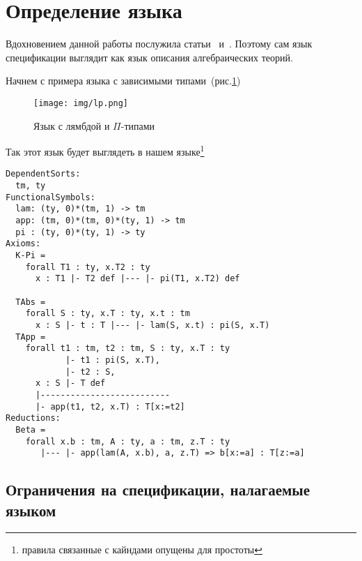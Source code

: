 \section{Определение языка}

Вдохновением данной работы послужила статьи~\cite{Palmgren} и~\cite{isaev}. Поэтому сам язык спецификации выглядит как язык описания алгебраических теорий.

Начнем с примера языка с зависимыми типами~(рис.\ref{lpi})~\cite[Глава~2.1]{book:pierce}

\begin{figure}
    \centering
	\texttt{[image: img/lp.png]}
	\caption{Язык с лямбдой и $\Pi$-типами }
	\label{lpi}
\end{figure}

Так этот язык будет выглядеть в нашем языке\footnote{правила связанные с кайндами опущены для простоты}

\begin{lstlisting}
DependentSorts:
  tm, ty
FunctionalSymbols:
  lam: (ty, 0)*(tm, 1) -> tm
  app: (tm, 0)*(tm, 0)*(ty, 1) -> tm
  pi : (ty, 0)*(ty, 1) -> ty
Axioms:
  K-Pi =
    forall T1 : ty, x.T2 : ty
      x : T1 |- T2 def |--- |- pi(T1, x.T2) def

  TAbs =
    forall S : ty, x.T : ty, x.t : tm
      x : S |- t : T |--- |- lam(S, x.t) : pi(S, x.T)
  TApp =
    forall t1 : tm, t2 : tm, S : ty, x.T : ty
            |- t1 : pi(S, x.T),
            |- t2 : S,
      x : S |- T def
      |--------------------------
      |- app(t1, t2, x.T) : T[x:=t2]
Reductions:
  Beta =
    forall x.b : tm, A : ty, a : tm, z.T : ty
       |--- |- app(lam(A, x.b), a, z.T) => b[x:=a] : T[z:=a]

\end{lstlisting}

\subsection{Ограничения на спецификации, налагаемые языком}

